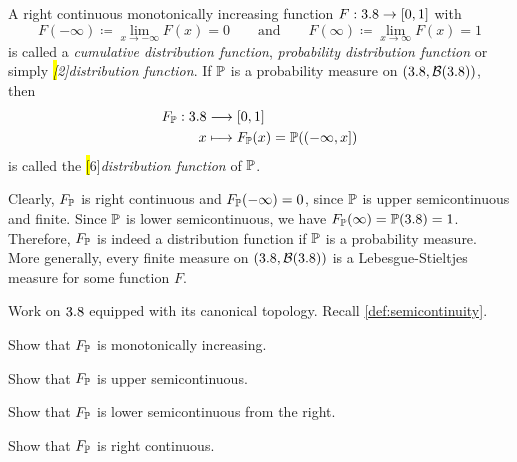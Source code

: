\begin{definition}\label{def:distribution-function}
A right continuous monotonically increasing function $F : 3.8 \to [0, 1]$ with
\[
F(-\infty) \coloneq \lim_{x \to -\infty} F(x) = 0
\qquad\text{and}\qquad
F(\infty) \coloneq \lim_{x \to \infty} F(x) = 1
\]
is called a \emph{cumulative distribution function}, \emph{probability distribution function} or simply \emph{\hl[2]{distribution function}}.
If $\mathbb{P}$ is a probability measure on $(3.8, \mathcal{B}(3.8))$, then
\[
\begin{aligned}
F_{\mathbb{P}} : 3.8 &\longrightarrow [0,1] \\
x &\longmapsto F_{\mathbb{P}}(x) = \mathbb{P}((-\infty,x])
\end{aligned}
\]
is called the \hl[6]{\emph{distribution function} of $\mathbb{P}$}.
\end{definition}




Clearly, $F_{\mathbb{P}}$ is right continuous and $F_{\mathbb{P}}(-\infty)=0$, since $\mathbb{P}$ is upper semicontinuous and finite. 
Since $\mathbb{P}$ is lower semicontinuous, we have $F_{\mathbb{P}}(\infty)=\mathbb{P}(3.8)=1$. 
Therefore, $F_{\mathbb{P}}$ is indeed a distribution function if $\mathbb{P}$ is a probability measure. 
More generally, every finite measure on $(3.8, \mathcal{B}(3.8))$ is a Lebesgue-Stieltjes measure for some function $F$.

\begin{exercise} %
Work on $3.8$ equipped with its canonical topology.
Recall \autoref{def:semicontinuity}.
\begin{enumerate}[label={\protect\hyperref[solitem:semicontinuity-distribution-functions:\arabic*]{(\alph*)}}]
\item \label{exitem:semicontinuity-distribution-functions:1}
Show that $F_{\mathbb{P}}$ is monotonically increasing.
\item \label{exitem:semicontinuity-distribution-functions:2}
Show that $F_{\mathbb{P}}$ is upper semicontinuous.
\item \label{exitem:semicontinuity-distribution-functions:3}
Show that $F_{\mathbb{P}}$ is lower semicontinuous from the right.
\item \label{exitem:semicontinuity-distribution-functions:4}
Show that $F_{\mathbb{P}}$ is right continuous.
\qedhere
\end{enumerate}
\end{exercise}

